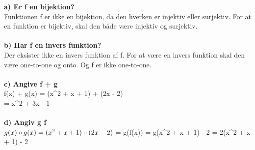 \documentclass{article}
\begin{document}
\textbf{a) Er f en bijektion?}\\
Funktionen f er ikke en bijektion, da den hverken er injektiv eller surjektiv. 
For at en funktion er bijektiv, skal den både være injektiv og surjektiv.\\\\

\textbf{b) Har f en invers funktion?}\\
Der eksister ikke en invers funktion af f. For at være en invers funktion skal den være one-to-one og onto. Og f er ikke one-to-one.\\\\

\textbf{c) Angive f + g}\\

f(x) + g(x) = (x^{2} + x + 1) + (2x - 2)\\

        = x^{2} + 3x - 1
\\\\

\textbf{d) Angiv g \circ \textbf{f}}\\

$ g(x) \circ g(x) = ( x^{2} + x + 1) \circ (2x - 2) \\

        $ = g(f(x)) = g(x^{2} + x + 1) - 2 = 2(x^{2} + x + 1) - 2
\end{document}

